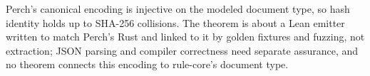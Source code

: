 \begin{statement}\label{stmt:canonical-identity}
Perch's canonical encoding is injective on the modeled document type, so hash identity holds up to SHA-256 collisions. The theorem is about a Lean emitter written to match Perch's Rust  and linked to it by golden fixtures and fuzzing, not extraction; JSON parsing and compiler correctness need separate assurance, and no theorem connects this encoding to rule-core's document type.
\end{statement}
